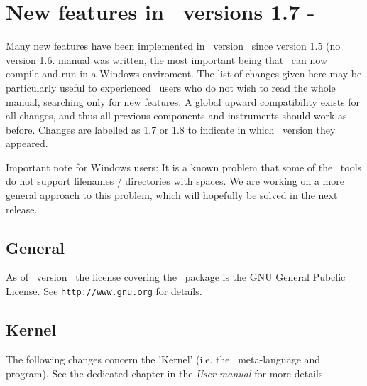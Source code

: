 
\chapter{New features in \MCS\ versions 1.7 - \version\ }
\label{c:changes}

Many new features have been implemented in \MCS\ version \version\  since
version 1.5 (no version 1.6. manual was written, the most important being that
\MCS\ can now compile and run in a Windows enviroment.  The list of changes
given here may be particularly  useful to experienced \MCS\ users who do not
wish to read the whole  manual, searching only for new features. A global
upward compatibility  exists for all changes, and thus all previous components
and  instruments should work as before. Changes are labelled as 1.7 or 1.8 to 
indicate in which \MCS\ version they appeared.

Important note for Windows users: It is a known problem that some of
the \MCS\ tools do not support filenames / directories with spaces.
We are working on a more general approach to this problem, which will
hopefully be solved in the next release.

\section{General}
\label{s:new-features:general}
As of \MCS\ version \version\, the license covering the \MCS\ package
is the GNU General Pubclic License. See \verb+http://www.gnu.org+ for details.

\section{Kernel} 
\label{s:new-features:kernel}

The following changes concern the 'Kernel' (i.e. the \MCS\ meta-language and program). See the dedicated chapter in the {\it User manual} for more details.

